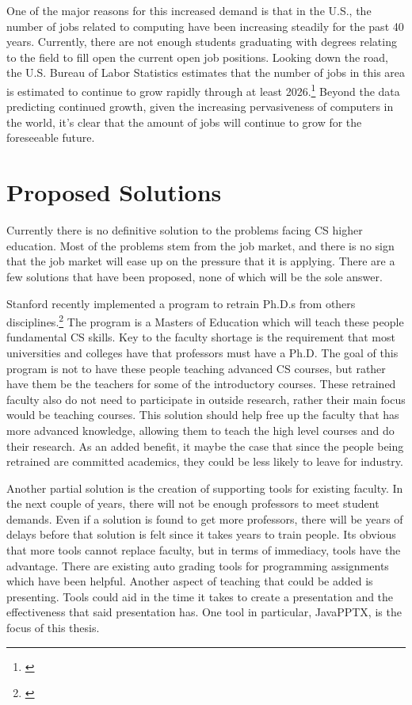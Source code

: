 \documentclass[12pt,twoside]{reedthesis}
\begin{document}
One of the major reasons for this increased demand is that in the U.S.,  the number of jobs related to computing have been increasing steadily for the past 40 years. Currently, there are not enough students graduating with degrees relating to the field to fill open the current open job positions. Looking down the road, the U.S. Bureau of Labor Statistics estimates that the number of jobs in this area is estimated to continue to grow rapidly through at least 2026.\footnote{\cite{BLS}} Beyond the data predicting continued growth, given the increasing pervasiveness of computers in the world, it's clear that the amount of jobs will continue to grow for the foreseeable future. 

\section{Proposed Solutions}

Currently there is no definitive solution to the problems facing CS higher education. Most of the problems stem from the job market, and there is no sign that the job market will ease up on the pressure that it is applying. There are a few solutions that have been proposed, none of which will be the sole answer.

Stanford recently implemented a program to retrain Ph.D.s from others disciplines.\footnote{\cite{starkman_stanford_0400}} The program is a Masters of Education which will teach these people fundamental CS skills. Key to the faculty shortage is the requirement that most universities and colleges have that professors must have a Ph.D. The goal of this program is not to have these people teaching advanced CS courses, but rather have them be the teachers for some of the introductory courses. These retrained faculty also do not need to participate in outside research, rather their main focus would be teaching courses. This solution should help free up the faculty that has more advanced knowledge, allowing them to teach the high level courses and do their research. As an added benefit, it maybe the case that since the people being retrained are committed academics, they could be less likely to leave for industry. 

Another partial solution is the creation of supporting tools for existing faculty. In the next couple of years, there will not be enough professors to meet student demands. Even if a solution is found to get more professors, there will be years of delays before that solution is felt since it takes years to train people. Its obvious that more tools cannot replace faculty, but in terms of immediacy, tools have the advantage. There are existing auto grading tools for programming assignments which have been helpful. Another aspect of teaching that could be added is presenting. Tools could aid in the time it takes to create a presentation and the effectiveness that said presentation has. One tool in particular, JavaPPTX, is the focus of this thesis.
\end{document}
